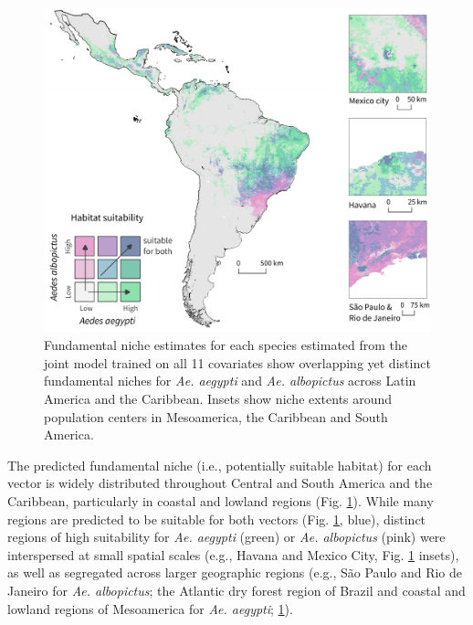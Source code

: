 \begin{figure}[!ht]
\includegraphics[width=\textwidth]{figures/ch3-map-aedes.pdf}
\centering
\caption[Fundamental niche estimates for each species estimated from the joint model trained on all 11 covariates show overlapping yet distinct fundamental niches for \textit{Ae. aegypti} and \textit{Ae. albopictus} across Latin America and the Caribbean.]{Fundamental niche estimates for each species estimated from the joint model trained on all 11 covariates show overlapping yet distinct fundamental niches for \textit{Ae. aegypti} and \textit{Ae. albopictus} across Latin America and the Caribbean. Insets show niche extents around population centers in Mesoamerica, the Caribbean and South America.}
\label{fig:map-aedes}
\end{figure}

The predicted fundamental niche (i.e., potentially suitable habitat) for each vector is widely distributed throughout Central and South America and the Caribbean, particularly in coastal and lowland regions (Fig. \ref{fig:map-aedes}). While many regions are predicted to be suitable for both vectors (Fig. \ref{fig:map-aedes}, blue), distinct regions of high suitability for \textit{Ae. aegypti} (green) or \textit{Ae. albopictus} (pink) were interspersed at small spatial scales (e.g., Havana and Mexico City, Fig. \ref{fig:map-aedes} insets), as well as segregated across larger geographic regions (e.g., São Paulo and Rio de Janeiro for \textit{Ae. albopictus}; the Atlantic dry forest region of Brazil and coastal and lowland regions of Mesoamerica for \textit{Ae. aegypti}; \ref{fig:map-aedes}).

